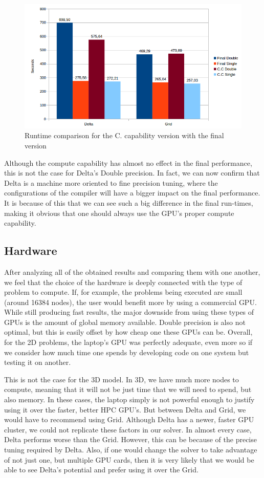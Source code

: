 \documentclass[12pt, openany]{book}
\begin{document}
  \begin{figure}[H]
  	\centering
  	\includegraphics[width=\linewidth]{Resources/Images/cc3d.png}
  	\caption{Runtime comparison for the C. capability version with the final version}
  	\label{fig:cc3d}
  \end{figure}
  
  Although the compute capability has almost no effect in the final performance, this is not the case for Delta's Double precision. In fact, we can now confirm that Delta is a machine more oriented to fine precision tuning, where the configurations of the compiler will have a bigger impact on the final performance. It is because of this that we can see such a big difference in the final run-times, making it obvious that one should always use the GPU's proper compute capability.

\subsection{Hardware}
After analyzing all of the obtained results and comparing them with one another, we feel that the choice of the hardware is deeply connected with the type of problem to compute. If, for example, the problems being executed are small (around 16384 nodes), the user would benefit more by using a commercial GPU. While still producing fast results, the major downside from using these types of GPUs is the amount of global memory available. Double precision is also not optimal, but this is easily offset by how cheap one these GPUs can be. Overall, for the 2D problems, the laptop's GPU was perfectly adequate, even more so if we consider how much time one spends by developing code on one system but testing it on another. \par
This is not the case for the 3D model. In 3D, we have much more nodes to compute, meaning that it will not be just time that we will need to spend, but also memory. In these cases, the laptop simply is not powerful enough to justify using it over the faster, better HPC GPU's. But between Delta and Grid, we would have to recommend using Grid. Although Delta has a newer, faster GPU cluster, we could not replicate these factors in our solver. In almost every case, Delta performs worse than the Grid. However, this can be because of the precise tuning required by Delta. Also, if one would change the solver to take advantage of not just one, but multiple GPU cards, then it is very likely that we would be able to see Delta's potential and prefer using it over the Grid.
\end{document}
